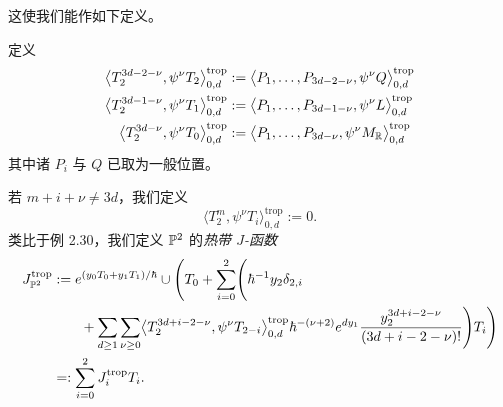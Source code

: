这使我们能作如下定义。

\begin{definition}
定义
\[
  \begin{aligned}
    \bigl\langle T_2^{3d-2-\nu},\psi^\nu T_2\bigr\rangle^{\mathrm{trop}}_{0,d}
    &:=\bigl\langle P_1,\ldots,P_{3d-2-\nu},\psi^\nu Q\bigr\rangle^{\mathrm{trop}}_{0,d}\\
    \bigl\langle T_2^{3d-1-\nu},\psi^\nu T_1\bigr\rangle^{\mathrm{trop}}_{0,d}
    &:=\bigl\langle P_1,\ldots,P_{3d-1-\nu},\psi^\nu L\bigr\rangle^{\mathrm{trop}}_{0,d}\\
    \bigl\langle T_2^{3d-\nu},\psi^\nu T_0\bigr\rangle^{\mathrm{trop}}_{0,d}
    &:=\bigl\langle P_1,\ldots,P_{3d-\nu},\psi^\nu M_{\mathbb{R}}\bigr\rangle^{\mathrm{trop}}_{0,d}
  \end{aligned}
\]
其中诸 $P_i$ 与 $Q$ 已取为一般位置。

若 $m+i+\nu\ne3d$，我们定义
\[
  \bigl\langle T_2^{m},\psi^\nu T_i\bigr\rangle^{\mathrm{trop}}_{0,d}:=0.
\]
类比于例 2.30，我们定义 $\mathbb{P}^2$ 的\emph{热带 $J$-函数}
\[
  \begin{aligned}
    J^{\mathrm{trop}}_{\mathbb{P}^2}
    &:=e^{(y_0T_0+y_1T_1)/\hbar}\cup\Biggl(
    T_0+\sum_{i=0}^{2}\Biggl(\hbar^{-1}y_2\delta_{2,i}\\
    &\qquad+\sum_{d\ge1}\sum_{\nu\ge0}
    \bigl\langle T_2^{3d+i-2-\nu},\psi^\nu T_{2-i}\bigr\rangle^{\mathrm{trop}}_{0,d}
    \hbar^{-(\nu+2)}e^{dy_1}\frac{y_2^{3d+i-2-\nu}}{(3d+i-2-\nu)!}\Biggr)T_i\Biggr)\\
    &=:\sum_{i=0}^{2}J^{\mathrm{trop}}_iT_i.
  \end{aligned}
\]
\end{definition}

